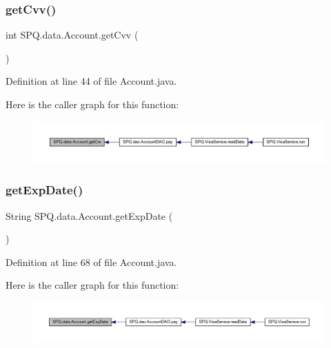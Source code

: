 \subsubsection{\texorpdfstring{get\+Cvv()}{getCvv()}}
{\footnotesize\ttfamily int S\+P\+Q.\+data.\+Account.\+get\+Cvv (\begin{DoxyParamCaption}{ }\end{DoxyParamCaption})}



Definition at line 44 of file Account.\+java.

Here is the caller graph for this function\+:
\nopagebreak
\begin{figure}[H]
\begin{center}
\leavevmode
\includegraphics[width=350pt]{class_s_p_q_1_1data_1_1_account_a6f30fcec03cf6e342b7c6d932166ebb1_icgraph}
\end{center}
\end{figure}
\mbox{\label{class_s_p_q_1_1data_1_1_account_a6980881f5f4cd0af58f6ccdc8d6916fc}} 
\subsubsection{\texorpdfstring{get\+Exp\+Date()}{getExpDate()}}
{\footnotesize\ttfamily String S\+P\+Q.\+data.\+Account.\+get\+Exp\+Date (\begin{DoxyParamCaption}{ }\end{DoxyParamCaption})}



Definition at line 68 of file Account.\+java.

Here is the caller graph for this function\+:
\nopagebreak
\begin{figure}[H]
\begin{center}
\leavevmode
\includegraphics[width=350pt]{class_s_p_q_1_1data_1_1_account_a6980881f5f4cd0af58f6ccdc8d6916fc_icgraph}
\end{center}
\end{figure}
\mbox{\label{class_s_p_q_1_1data_1_1_account_a7ac2f177ba411765320259ed3a63b5b2}} 
